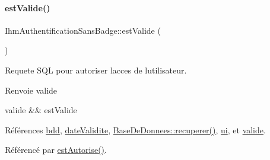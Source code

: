 \mbox{\label{class_ihm_authentification_sans_badge_a676cfdbf93ef79fb7c4c47fdd8d0fb43}} 
\paragraph{\texorpdfstring{est\+Valide()}{estValide()}}
{\footnotesize\ttfamily Ihm\+Authentification\+Sans\+Badge\+::est\+Valide (\begin{DoxyParamCaption}{ }\end{DoxyParamCaption})}

Requete S\+QL pour autoriser l\textquotesingle{}acces de l\textquotesingle{}utilisateur.

\begin{DoxyReturn}{Renvoie}
valide

valide \&\& est\+Valide 
\end{DoxyReturn}


Références \hyperlink{class_ihm_authentification_sans_badge_acf93b261335b6128af77de61994b9491}{bdd}, \hyperlink{class_ihm_authentification_sans_badge_afd0f3b5e59208d58be78f0cb741d4be7}{date\+Validite}, \hyperlink{class_base_de_donnees_a77539baad389f5acf754cd2cd452403e}{Base\+De\+Donnees\+::recuperer()}, \hyperlink{class_ihm_authentification_sans_badge_a95e8a9d049b6e5f262b45e3362d2bbee}{ui}, et \hyperlink{class_ihm_authentification_sans_badge_a653eb9abd54ba736b3d98b994a7e4f1f}{valide}.



Référencé par \hyperlink{class_ihm_authentification_sans_badge_a17b178accdfe141a7e27fa1888bebcbc}{est\+Autorise()}.


